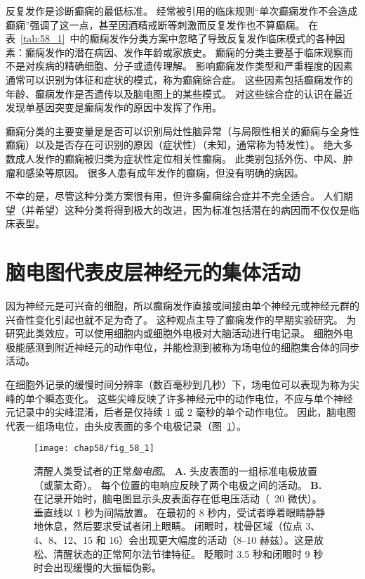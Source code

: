 反复发作是诊断癫痫的最低标准。
经常被引用的临床规则“单次癫痫发作不会造成癫痫”强调了这一点，甚至因酒精戒断等刺激而反复发作也不算癫痫。
在表~\ref{tab:58_1}~中的癫痫发作分类方案中忽略了导致反复发作临床模式的各种因素：癫痫发作的潜在病因、发作年龄或家族史。
癫痫的分类主要基于临床观察而不是对疾病的精确细胞、分子或遗传理解。
影响癫痫发作类型和严重程度的因素通常可以识别为体征和症状的模式，称为癫痫综合症。
这些因素包括癫痫发作的年龄、癫痫发作是否遗传以及脑电图上的某些模式。
对这些综合症的认识在最近发现单基因突变是癫痫发作的原因中发挥了作用。


癫痫分类的主要变量是是否可以识别局灶性脑异常（与局限性相关的癫痫与全身性癫痫）以及是否存在可识别的原因（症状性）（未知，通常称为特发性）。
绝大多数成人发作的癫痫被归类为症状性定位相关性癫痫。
此类别包括外伤、中风、肿瘤和感染等原因。
很多人患有成年发作的癫痫，但没有明确的病因。


不幸的是，尽管这种分类方案很有用，但许多癫痫综合症并不完全适合。
人们期望（并希望）这种分类将得到极大的改进，因为标准包括潜在的病因而不仅仅是临床表型。



\section{脑电图代表皮层神经元的集体活动}

因为神经元是可兴奋的细胞，所以癫痫发作直接或间接由单个神经元或神经元群的兴奋性变化引起也就不足为奇了。
这种观点主导了癫痫发作的早期实验研究。
为研究此类效应，可以使用细胞内或细胞外电极对大脑活动进行电记录。
细胞外电极能感测到附近神经元的动作电位，并能检测到被称为场电位的细胞集合体的同步活动。


在细胞外记录的缓慢时间分辨率（数百毫秒到几秒）下，场电位可以表现为称为尖峰的单个瞬态变化。
这些尖峰反映了许多神经元中的动作电位，不应与单个神经元记录中的尖峰混淆，后者是仅持续 1 或 2 毫秒的单个动作电位。
因此，脑电图代表一组场电位，由头皮表面的多个电极记录（图~\ref{fig:58_1}）。


\begin{figure}[htbp]
	\centering
	\texttt{[image: chap58/fig\_58\_1]}
	\caption{清醒人类受试者的正常\textit{脑电图}。
		\textbf{A.} 头皮表面的一组标准电极放置（或蒙太奇）。
		每个位置的电响应反映了两个电极之间的活动。
		\textbf{B.} 在记录开始时，脑电图显示头皮表面存在低电压活动（~20 微伏）。
		垂直线以 1 秒为间隔放置。
		在最初的 8 秒内，受试者睁着眼睛静静地休息，然后要求受试者闭上眼睛。
		闭眼时，枕骨区域（位点 3、4、8、12、15 和 16）会出现更大幅度的活动（8–10 赫兹）。这是放松、清醒状态的正常阿尔法节律特征。
		眨眼时 3.5 秒和闭眼时 9 秒时会出现缓慢的大振幅伪影。}
	\label{fig:58_1}
\end{figure}


